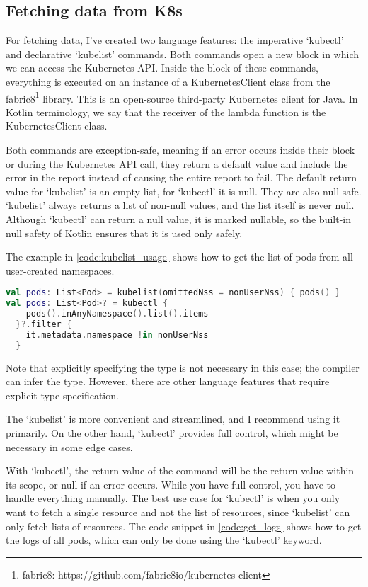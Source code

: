 \subsection{Fetching data from K8s}

For fetching data, I've created two language features: the imperative `kubectl' and declarative `kubelist' commands. Both commands open a new block in which we can access the Kubernetes API. Inside the block of these commands, everything is executed on an instance of a KubernetesClient class from the fabric8\footnote{fabric8: https://github.com/fabric8io/kubernetes-client} library. This is an open-source third-party Kubernetes client for Java. In Kotlin terminology, we say that the receiver of the lambda function is the KubernetesClient class.

Both commands are exception-safe, meaning if an error occurs inside their block or during the Kubernetes API call, they return a default value and include the error in the report instead of causing the entire report to fail. The default return value for `kubelist' is an empty list, for `kubectl' it is null. They are also null-safe. `kubelist' always returns a list of non-null values, and the list itself is never null. Although `kubectl' can return a null value, it is marked nullable, so the built-in null safety of Kotlin ensures that it is used only safely.

The example in \ref{code:kubelist_usage} shows how to get the list of pods from all user-created namespaces.

\begin{lstlisting}[caption={Usage of kubelist and kubectl},language=Kotlin,label=code:kubelist_usage]
val pods: List<Pod> = kubelist(omittedNss = nonUserNss) { pods() }
val pods: List<Pod>? = kubectl { 
    pods().inAnyNamespace().list().items 
  }?.filter { 
    it.metadata.namespace !in nonUserNss 
  }
\end{lstlisting}

Note that explicitly specifying the type is not necessary in this case; the compiler can infer the type. However, there are other language features that require explicit type specification.

The `kubelist' is more convenient and streamlined, and I recommend using it primarily. On the other hand, `kubectl' provides full control, which might be necessary in some edge cases.

With `kubectl', the return value of the command will be the return value within its scope, or null if an error occurs. While you have full control, you have to handle everything manually. The best use case for `kubectl' is when you only want to fetch a single resource and not the list of resources, since `kubelist' can only fetch lists of resources. The code snippet in \ref{code:get_logs} shows how to get the logs of all pods, which can only be done using the `kubectl' keyword.

